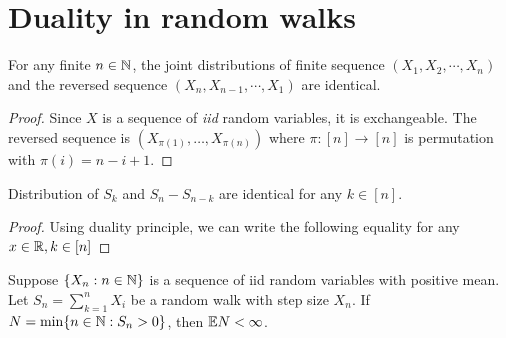 \documentclass[a4paper,10pt,english]{article}
\begin{document}
\section{Duality in random walks}
\begin{lem} 
For any finite $n \in \mathbb{N}$, the joint distributions of finite sequence $(X_1,X_2,\cdots,X_n)$ and the reversed sequence $(X_n, X_{n-1},\cdots, X_1)$ are identical.
\end{lem}
\begin{proof}
Since $X$ is a sequence of \textit{iid} random variables, it is exchangeable. 
The reversed sequence is $(X_{\pi(1)}, \dots, X_{\pi(n)})$ where $\pi: [n] \to [n]$ is permutation with $\pi(i) = n-i+1$. 
\end{proof}
 \begin{cor} 
 Distribution of $S_k$ and $S_n - S_{n-k}$ are identical for any $k \in [n]$.  
 \end{cor}
 \begin{proof} 
 Using duality principle, we can write the following equality for any $x \in \mathbb{R}, k \in [n]$
 \end{proof}
\begin{prop}
Suppose $\{X_n: n \in \mathbb{N}\}$ is a sequence of iid random variables with positive mean. 
Let $S_n = \sum_{k=1}^n X_i$ be a random walk with step size $X_n$. If 
$N = \min \{n \in \mathbb{N} : S_n > 0\}$, 
then $\mathbb{E} N < \infty$.
\end{prop}
\end{document}
